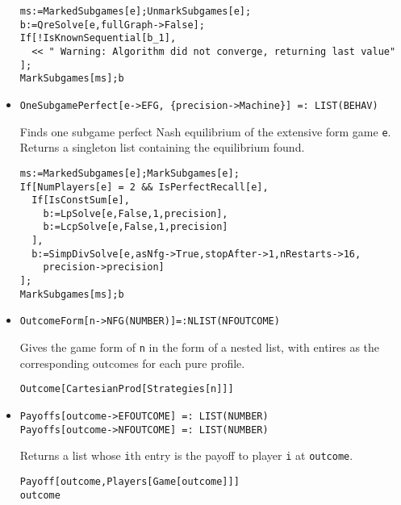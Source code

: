 \begin{itemize}
\begin{verbatim}
ms:=MarkedSubgames[e];UnmarkSubgames[e];
b:=QreSolve[e,fullGraph->False];
If[!IsKnownSequential[b_1],
  << " Warning: Algorithm did not converge, returning last value"
];
MarkSubgames[ms];b
\end{verbatim} 
\ed

\item{}
\protect \large \begin{verbatim}
OneSubgamePerfect[e->EFG, {precision->Machine}] =: LIST(BEHAV) 
\end{verbatim}\normalsize

\bd 
Finds one subgame perfect Nash equilibrium of the extensive form
game \verb+e+.  Returns a singleton list containing the equilibrium
found.

\begin{verbatim}
ms:=MarkedSubgames[e];MarkSubgames[e];
If[NumPlayers[e] = 2 && IsPerfectRecall[e],
  If[IsConstSum[e],
    b:=LpSolve[e,False,1,precision],
    b:=LcpSolve[e,False,1,precision]
  ],
  b:=SimpDivSolve[e,asNfg->True,stopAfter->1,nRestarts->16,
    precision->precision]
];
MarkSubgames[ms];b
\end{verbatim} 
\ed

\item{}
\protect \large \begin{verbatim}
OutcomeForm[n->NFG(NUMBER)]=:NLIST(NFOUTCOME)
\end{verbatim}\normalsize

\bd 
Gives the game form of \verb+n+ in the form of a nested list, with
entires as the corresponding outcomes for each pure profile. 

\begin{verbatim}
Outcome[CartesianProd[Strategies[n]]]
\end{verbatim} 
\ed


\item{}
\protect \large \begin{verbatim}
Payoffs[outcome->EFOUTCOME] =: LIST(NUMBER) 
Payoffs[outcome->NFOUTCOME] =: LIST(NUMBER) 
\end{verbatim}\normalsize

\bd 
Returns a list whose \verb+i+th entry is the payoff to player \verb+i+
at \verb+outcome+.
\begin{verbatim}
Payoff[outcome,Players[Game[outcome]]]
outcome
\end{verbatim} 
\ed


\end{itemize}
